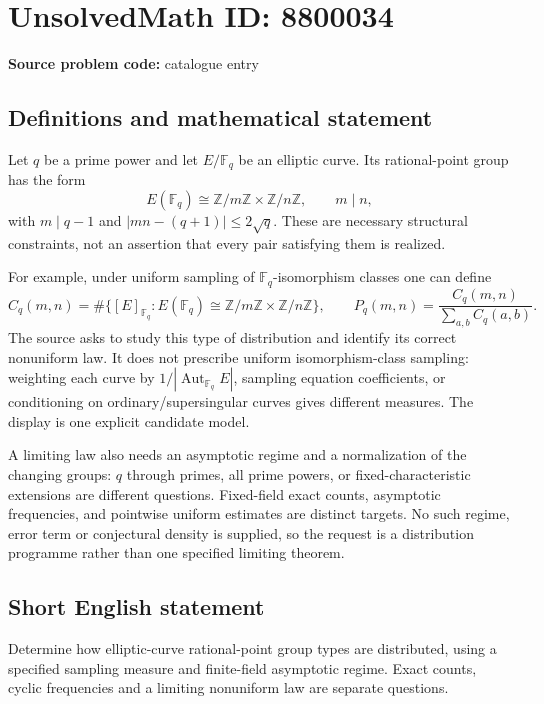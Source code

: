 \documentclass[11pt]{article}
\newcommand{\Z}{\mathbb{Z}}
\newcommand{\F}{\mathbb{F}}
\begin{document}
\section*{UnsolvedMath ID: 8800034}
\textbf{Source problem code:} catalogue entry
\subsection{Definitions and mathematical statement}
Let $q$ be a prime power and let $E/\F_q$ be an elliptic curve. Its rational-point group has the form
\[
E(\F_q)\cong\Z/m\Z\times\Z/n\Z,\qquad m\mid n,
\]
with $m\mid q-1$ and $|mn-(q+1)|\leq2\sqrt q$. These are necessary structural constraints, not an assertion that every pair satisfying them is realized.

For example, under uniform sampling of $\F_q$-isomorphism classes one can define
\[
C_q(m,n)=\#\{[E]_{\F_q}:E(\F_q)\cong\Z/m\Z\times\Z/n\Z\},\qquad
P_q(m,n)=\frac{C_q(m,n)}{\sum_{a,b}C_q(a,b)}.
\]
The source asks to study this type of distribution and identify its correct nonuniform law. It does not prescribe uniform isomorphism-class sampling: weighting each curve by $1/|\operatorname{Aut}_{\F_q}E|$, sampling equation coefficients, or conditioning on ordinary/supersingular curves gives different measures. The display is one explicit candidate model.

A limiting law also needs an asymptotic regime and a normalization of the changing groups: $q$ through primes, all prime powers, or fixed-characteristic extensions are different questions. Fixed-field exact counts, asymptotic frequencies, and pointwise uniform estimates are distinct targets. No such regime, error term or conjectural density is supplied, so the request is a distribution programme rather than one specified limiting theorem.
\subsection{Short English statement}
Determine how elliptic-curve rational-point group types are distributed, using a specified sampling measure and finite-field asymptotic regime. Exact counts, cyclic frequencies and a limiting nonuniform law are separate questions.
\end{document}
